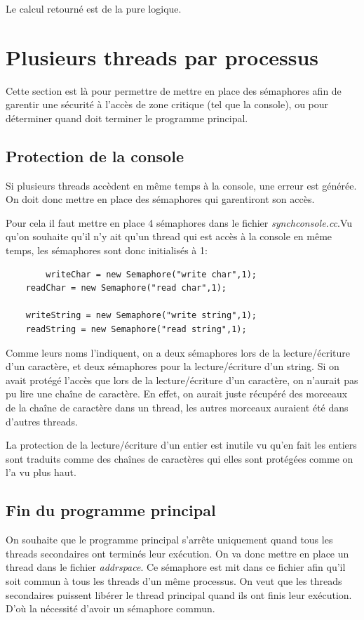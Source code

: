 \documentclass[a4paper,10pt]{article}
\begin{document}
   Le calcul retourné est de la pure logique.
   
   \section{Plusieurs threads par processus}
      Cette section est là pour permettre de mettre en place des sémaphores afin de garentir une sécurité à l'accès de zone critique (tel que la console),
      ou pour déterminer quand doit terminer le programme principal.
      \subsection{Protection de la console}
      Si plusieurs threads accèdent en même temps à la console, une erreur est générée. On doit donc mettre en place des sémaphores qui garentiront 
      son accès.
      
      Pour cela il faut mettre en place 4 sémaphores dans le fichier \emph{synchconsole.cc}.Vu qu'on souhaite qu'il n'y ait qu'un thread qui est accès à la
      console en même temps, les sémaphores sont donc initialisés à 1:
      \begin{lstlisting}
       	writeChar = new Semaphore("write char",1);
	readChar = new Semaphore("read char",1);

	writeString = new Semaphore("write string",1);
	readString = new Semaphore("read string",1);
      \end{lstlisting}
      
      Comme leurs noms l'indiquent, on a deux sémaphores lors de la lecture/écriture d'un caractère, et deux sémaphores pour la lecture/écriture d'un string.
      Si on avait protégé l'accès que lors de la lecture/écriture d'un caractère, on n'aurait pas pu lire une chaîne de caractère. En effet, on aurait juste
      récupéré des morceaux de la chaîne de caractère dans un thread, les autres morceaux auraient été dans d'autres threads.
      
      La protection de la lecture/écriture d'un entier est inutile vu qu'en fait les entiers sont traduits comme des chaînes de caractères qui elles sont 
      protégées comme on l'a vu plus haut.
      
      \subsection{Fin du programme principal}
      On souhaite que le programme principal s'arrête uniquement quand tous les threads secondaires ont terminés leur exécution. On va donc mettre en 
      place un thread dans le fichier \emph{addrspace}. Ce sémaphore est mit dans ce fichier afin qu'il soit commun à tous les threads d'un même processus.
      On veut que les threads secondaires puissent libérer le thread principal quand ils ont finis leur exécution. D'où la nécessité d'avoir un sémaphore
      commun.
      
\end{document}
